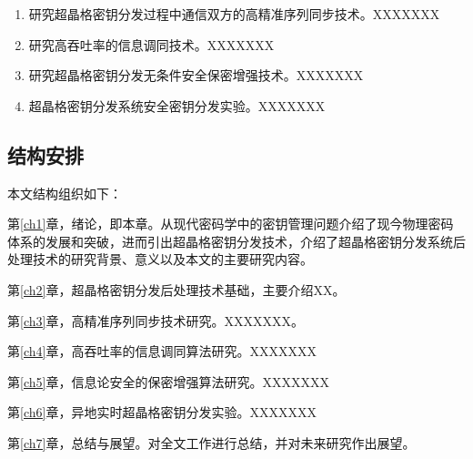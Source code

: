 \begin{enumerate}[(1)]
	\item 研究超晶格密钥分发过程中通信双方的高精准序列同步技术。XXXXXXX
	\item 研究高吞吐率的信息调同技术。XXXXXXX
	\item 研究超晶格密钥分发无条件安全保密增强技术。XXXXXXX
	\item 超晶格密钥分发系统安全密钥分发实验。XXXXXXX
\end{enumerate}

\subsection{结构安排}

本文结构组织如下：

第\ref{ch1}章，绪论，即本章。从现代密码学中的密钥管理问题介绍了现今物理密码体系的发展和突破，进而引出超晶格密钥分发技术，介绍了超晶格密钥分发系统后处理技术的研究背景、意义以及本文的主要研究内容。

第\ref{ch2}章，超晶格密钥分发后处理技术基础，主要介绍XX。

第\ref{ch3}章，高精准序列同步技术研究。XXXXXXX。

第\ref{ch4}章，高吞吐率的信息调同算法研究。XXXXXXX

第\ref{ch5}章，信息论安全的保密增强算法研究。XXXXXXX

第\ref{ch6}章，异地实时超晶格密钥分发实验。XXXXXXX

第\ref{ch7}章，总结与展望。对全文工作进行总结，并对未来研究作出展望。

